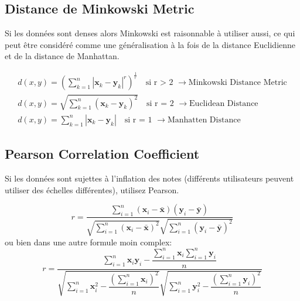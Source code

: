 \documentclass[11pt,fleqn]{book} %
\begin{document}
\subsection{Distance de Minkowski Metric}
Si les données sont denses alors Minkowski est raisonnable à utiliser aussi, ce qui peut être considéré comme une généralisation à la fois de la distance Euclidienne et de la distance de Manhattan.
\vspace{3mm}
\begin{theorem}
\begin{align}
    d(x,y) =(\sum_{k=1}^n|\mathbf{x}_k - \mathbf{y}_k|^r)^\frac{1}{r} \quad\text{si r > 2 }\rightarrow{\text{Minkowski Distance Metric}}\\
    d(x,y) =\sqrt{\sum_{k=1}^n(\mathbf{x}_k - \mathbf{y}_k)^2}\quad\text{si r = 2 }\rightarrow{\text{Euclidean Distance}}\\
    d(x,y) = \sum_{k=1}^n|\mathbf{x}_k - \mathbf{y}_k|\quad\text{si r = 1 }\rightarrow{\text{Manhatten Distance}}
\end{align}
\end{theorem}
\subsection{Pearson Correlation Coefficient}
Si les données sont sujettes à l'inflation des notes (différents utilisateurs peuvent utiliser des échelles différentes), utilisez Pearson.
\vspace{3mm}
\begin{theorem}
$$
    r =\dfrac{\sum_{i=1}^n(\mathbf{x}_i - \bar{\mathbf{x}})(\mathbf{y}_i - \bar{\mathbf{y}})}{\sqrt{\sum_{i=1}^n(\mathbf{x}_i - \bar{\mathbf{x}})^2}\sqrt{\sum_{i=1}^n(\mathbf{y}_i - \bar{\mathbf{y}})^2}}
$$
ou bien dans une autre formule moin complex:
$$
r = \dfrac{\sum_{i=1}^n\mathbf{x}_i\mathbf{y}_i - \dfrac{\sum_{i=1}^n\mathbf{x}_i\sum_{i=1}^n\mathbf{y}_i}{n}}{\sqrt{\sum_{i=1}^n\mathbf{x}_i^2 - \dfrac{(\sum_{i=1}^n\mathbf{x}_i)^2}{n}}\sqrt{\sum_{i=1}^n\mathbf{y}_i^2 - \dfrac{(\sum_{i=1}^n\mathbf{y}_i)^2}{n}}}
$$
\end{theorem}
\end{document}
